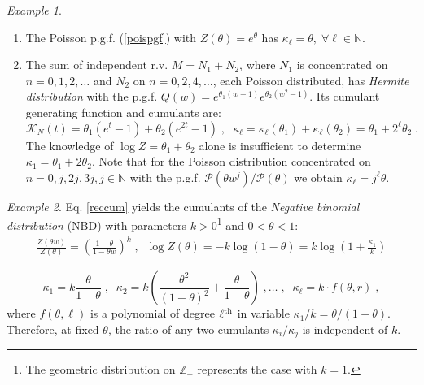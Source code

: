 \documentclass[a4paper,12pt]{amsart}
\newcommand{\N}{\mathbb{N}}
\newcommand{\Z}{\mathbb{Z}_{+}}
\theoremstyle{definition}
\theoremstyle{remark}
\newtheorem{Example}{Example}[section]
\begin{document}
\begin{Example}~~~~
\begin{enumerate}[label=(\roman*), leftmargin=*]
\item The Poisson p.g.f. (\ref{poispgf}) with 
$Z(\theta)=e^{\theta}$ has $\kappa_{\ell}=\theta,\;\forall \ell \in \N$.  
\item The sum of independent r.v. $M=N_1+N_2$, where $N_1$ is concentrated on $n=0,1,2,\ldots$ and $N_2$ on $n=0,2,4,\ldots$, each Poisson distributed, has {\it Hermite distribution} \cite{JKK2005} with the p.g.f. $Q(w)=e^{\theta_1(w-1)}e^{\theta_2(w^2-1)}$. Its cumulant generating function and cumulants  are: 
\begin{equation} \label{Hercum}
    \mathcal{K}_N(t)= \theta_1(e^{t} - 1) + \theta_2(e^{2t} - 1)\;,\;\; \kappa_{\ell} = \kappa_{\ell}(\theta_1)+\kappa_{\ell}(\theta_2) =\theta_1+ 2^{\ell}\theta_2\;.
\end{equation}
The knowledge of $\log Z =\theta_1  + \theta_2$ alone is insufficient to determine $\kappa_1=\theta_1+2\theta_2$. Note that for the Poisson distribution concentrated on $n=0,j,2j,3j, j\in \N$ with the p.g.f. $\mathcal{P}(\theta w^j)/\mathcal{P}(\theta)$ we obtain $\kappa_{\ell}=j^{\ell} \theta$. 
\end{enumerate}
\end{Example}
\begin{Example}
Eq. \ref{reccum} yields the cumulants of the {\it Negative binomial distribution} (NBD) with parameters $k>0$\footnote{The geometric distribution on $\Z$ represents the case with $k=1$.} and $0<\theta<1$: 
\begin{eqnarray}\label{NBD}
 \frac{Z(\theta w)}{Z(\theta)}= \left(\frac{1-\theta }{1-\theta w}\right)^k\;,\;\;
 \log Z(\theta)  =-k \log (1\!-\!\theta)
 =k\log \left(1\!+\!\frac{\kappa_1}{k}\right)
\end{eqnarray}
 
\begin{equation} 
\label{NBD_cum}
\kappa_{1}= k\frac{\theta }{1-\theta }\;,\;\; \kappa_2=k \left(\frac{\theta ^2}{(1-\theta )^2}+\frac{\theta}{1-\theta }\right)\;, \ldots\;, \;\;\kappa_{\ell}= k\cdot f(\theta,r)\;,
\end{equation}
where $f(\theta,\ell)$ is a polynomial of degree $\ell^{\rm th}$  in variable $\kappa_1/k=\theta/(1-\theta)$.  
Therefore, at fixed $\theta$, the ratio of any two cumulants $\kappa_i/\kappa_j$ is independent of $k$. 
\end{Example}
\end{document}

